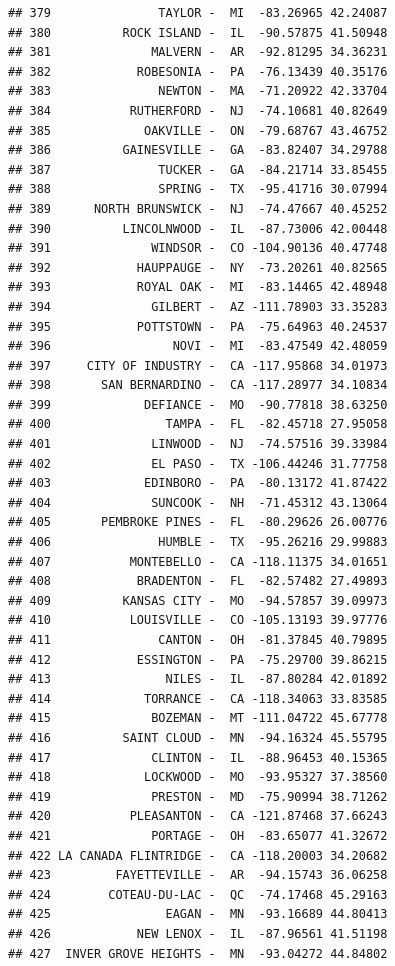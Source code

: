 \documentclass{article}\usepackage[]{graphicx}\usepackage[]{color}
\makeatletter
\newenvironment{kframe}{%
 \def\at@end@of@kframe{}%
 \ifinner\ifhmode%
  \def\at@end@of@kframe{\end{minipage}}%
  \begin{minipage}{\columnwidth}%
 \fi\fi%
 \def\FrameCommand##1{\hskip\@totalleftmargin \hskip-\fboxsep
 \colorbox{shadecolor}{##1}\hskip-\fboxsep
     \hskip-\linewidth \hskip-\@totalleftmargin \hskip\columnwidth}%
 \MakeFramed {\advance\hsize-\width
   \@totalleftmargin\z@ \linewidth\hsize
   \@setminipage}}%
 {\par\unskip\endMakeFramed%
 \at@end@of@kframe}
\newenvironment{knitrout}{}{} %
\makeatother
\begin{document}
\begin{knitrout}
\begin{kframe}
\begin{verbatim}
## 379               TAYLOR -  MI  -83.26965 42.24087
## 380          ROCK ISLAND -  IL  -90.57875 41.50948
## 381              MALVERN -  AR  -92.81295 34.36231
## 382            ROBESONIA -  PA  -76.13439 40.35176
## 383               NEWTON -  MA  -71.20922 42.33704
## 384           RUTHERFORD -  NJ  -74.10681 40.82649
## 385             OAKVILLE -  ON  -79.68767 43.46752
## 386          GAINESVILLE -  GA  -83.82407 34.29788
## 387               TUCKER -  GA  -84.21714 33.85455
## 388               SPRING -  TX  -95.41716 30.07994
## 389      NORTH BRUNSWICK -  NJ  -74.47667 40.45252
## 390          LINCOLNWOOD -  IL  -87.73006 42.00448
## 391              WINDSOR -  CO -104.90136 40.47748
## 392            HAUPPAUGE -  NY  -73.20261 40.82565
## 393            ROYAL OAK -  MI  -83.14465 42.48948
## 394              GILBERT -  AZ -111.78903 33.35283
## 395            POTTSTOWN -  PA  -75.64963 40.24537
## 396                 NOVI -  MI  -83.47549 42.48059
## 397     CITY OF INDUSTRY -  CA -117.95868 34.01973
## 398       SAN BERNARDINO -  CA -117.28977 34.10834
## 399             DEFIANCE -  MO  -90.77818 38.63250
## 400                TAMPA -  FL  -82.45718 27.95058
## 401              LINWOOD -  NJ  -74.57516 39.33984
## 402              EL PASO -  TX -106.44246 31.77758
## 403             EDINBORO -  PA  -80.13172 41.87422
## 404              SUNCOOK -  NH  -71.45312 43.13064
## 405       PEMBROKE PINES -  FL  -80.29626 26.00776
## 406               HUMBLE -  TX  -95.26216 29.99883
## 407           MONTEBELLO -  CA -118.11375 34.01651
## 408            BRADENTON -  FL  -82.57482 27.49893
## 409          KANSAS CITY -  MO  -94.57857 39.09973
## 410           LOUISVILLE -  CO -105.13193 39.97776
## 411               CANTON -  OH  -81.37845 40.79895
## 412            ESSINGTON -  PA  -75.29700 39.86215
## 413                NILES -  IL  -87.80284 42.01892
## 414             TORRANCE -  CA -118.34063 33.83585
## 415              BOZEMAN -  MT -111.04722 45.67778
## 416          SAINT CLOUD -  MN  -94.16324 45.55795
## 417              CLINTON -  IL  -88.96453 40.15365
## 418             LOCKWOOD -  MO  -93.95327 37.38560
## 419              PRESTON -  MD  -75.90994 38.71262
## 420           PLEASANTON -  CA -121.87468 37.66243
## 421              PORTAGE -  OH  -83.65077 41.32672
## 422 LA CANADA FLINTRIDGE -  CA -118.20003 34.20682
## 423         FAYETTEVILLE -  AR  -94.15743 36.06258
## 424        COTEAU-DU-LAC -  QC  -74.17468 45.29163
## 425                EAGAN -  MN  -93.16689 44.80413
## 426            NEW LENOX -  IL  -87.96561 41.51198
## 427  INVER GROVE HEIGHTS -  MN  -93.04272 44.84802

\end{verbatim}
\end{kframe}
\end{knitrout}
\end{document}
